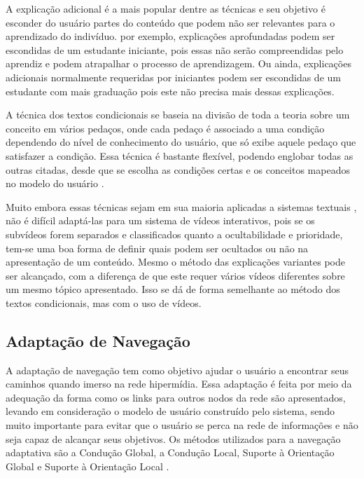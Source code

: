 A explicação adicional é a mais popular dentre as técnicas e seu objetivo é esconder do usuário partes do conteúdo que podem não ser relevantes para o aprendizado do indivíduo. por exemplo, explicações aprofundadas podem ser escondidas de um estudante iniciante, pois essas não serão compreendidas pelo aprendiz e podem atrapalhar o processo de aprendizagem. Ou ainda, explicações adicionais normalmente requeridas por iniciantes podem ser escondidas de um estudante com mais graduação pois este não precisa mais dessas explicações.

A técnica dos textos condicionais se baseia na divisão de toda a teoria sobre um conceito em vários pedaços, onde cada pedaço é associado a uma condição dependendo do nível de conhecimento do usuário, que só exibe aquele pedaço que satisfazer a condição. Essa técnica é bastante flexível, podendo englobar todas as outras citadas, desde que se escolha as condições certas e os conceitos mapeados no modelo do usuário \cite{brusilovsky1996}.

Muito embora essas técnicas sejam em sua maioria aplicadas a sistemas textuais \cite{brusilovsky1996, fragelli2010}, não é difícil adaptá-las para um sistema de vídeos interativos, pois se os subvídeos forem separados e classificados quanto a ocultabilidade e prioridade, tem-se uma boa forma de definir quais podem ser ocultados ou não na apresentação de um conteúdo. Mesmo o método das explicações variantes pode ser alcançado, com a diferença de que este requer vários vídeos diferentes sobre um mesmo tópico apresentado. Isso se dá de forma semelhante ao método dos textos condicionais, mas com o uso de vídeos.

\subsection{Adaptação de Navegação}

A adaptação de navegação tem como objetivo ajudar o usuário a encontrar seus caminhos quando imerso na rede hipermídia. Essa adaptação é feita por meio da adequação da forma como os links para outros nodos da rede são apresentados, levando em consideração o modelo de usuário construído pelo sistema, sendo muito importante para evitar que o usuário se perca na rede de informações e não seja capaz de alcançar seus objetivos. Os métodos utilizados para a navegação adaptativa são a Condução Global, a Condução Local, Suporte à Orientação Global e Suporte à Orientação Local \cite{brusilovsky1996, palazzo2000}.

